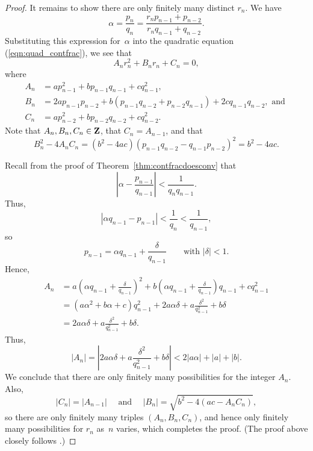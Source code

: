 \begin{proof}
It remains to show there are only finitely many distinct $r_n$.  We
have
$$
  \alpha = \frac{p_n}{q_n} =
     \frac{r_n p_{n-1} + p_{n-2}}{r_n q_{n-1} + q_{n-2}}.
$$
Substituting this expression for~$\alpha$ into the
quadratic equation (\ref{eqn:quad_contfrac}),  we see that
$$A_n r_n^2 + B_n r_n + C_n = 0,$$
where
\begin{align*}
 A_n &= a p_{n-1}^2 + b p_{n-1} q_{n-1} + c q_{n-1}^2,\\
 B_n &= 2a p_{n-1} p_{n-2} + b(p_{n-1} q_{n-2} + p_{n-2} q_{n-1}) + 2c q_{n-1} q_{n-2}, \text{ and }\\
 C_n &= a p_{n-2}^2 + b p_{n-2} q_{n-2} + c q_{n-2}^2.
\end{align*}
Note that $A_n, B_n, C_n\in\mathbf{Z}$, that $C_n = A_{n-1}$, and that
$$
  B_n^2 - 4A_n C_n = (b^2- 4ac)(p_{n-1}q_{n-2} - q_{n-1}p_{n-2})^2 = b^2 - 4ac.
$$

Recall from the proof of Theorem~\ref{thm:contfracdoesconv} that
$$
  \left| \alpha - \frac{p_{n-1}}{q_{n-1}}\right|
  < \frac{1}{q_n q_{n-1}}.
$$
Thus,
$$
  \left| \alpha q_{n-1} - p_{n-1}\right| < \frac{1}{q_n} < \frac{1}{q_{n-1}},
$$
so
$$
  p_{n-1} = \alpha q_{n-1} + \frac{\delta}{q_{n-1}}
\qquad\text{with }|\delta| < 1.
$$
Hence,
\begin{align*}
  A_n &= a\left(\alpha q_{n-1} + \frac{\delta}{q_{n-1}}\right)^2
        +b\left(\alpha q_{n-1} + \frac{\delta}{q_{n-1}}\right)q_{n-1}
        +c q_{n-1}^2\\
      &= (a\alpha^2 + b\alpha + c)q_{n-1}^2 + 2a\alpha\delta +
           a\frac{\delta^2}{q_{n-1}^2} + b\delta\\
      &= 2a\alpha\delta + a\frac{\delta^2}{q_{n-1}^2} + b\delta.
\end{align*}
Thus,
$$
  |A_n| = \left|2a\alpha\delta + a\frac{\delta^2}{q_{n-1}^2} + b\delta\right|
       < 2|a\alpha| + |a| + |b|.
$$
We conclude that there are only finitely many possibilities for the integer $A_n$.
Also,
$$
  |C_n| = |A_{n-1}|
  \quad\text{ and }\quad
  |B_n| = \sqrt{b^2 - 4(ac-A_n C_n)},
$$
so there are only finitely many triples $(A_n, B_n, C_n)$,
and hence only finitely many possibilities for $r_n$ as~$n$
varies, which completes the proof.
(The proof above closely follows \cite[Thm.~177, pg.144--145]{hardywright}.)
\end{proof}

